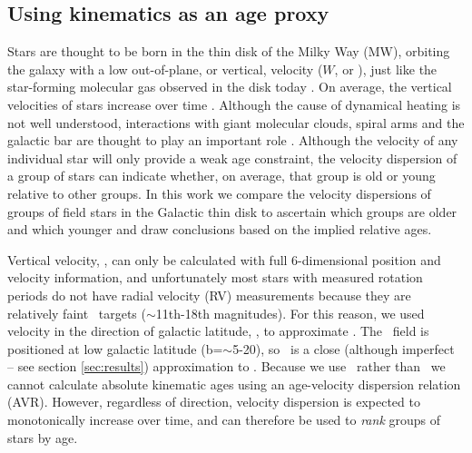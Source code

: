 \subsection{Using kinematics as an age proxy}

Stars are thought to be born in the thin disk of the Milky Way (MW), orbiting
the galaxy with a low out-of-plane, or vertical, velocity ($W$, or \vz),
just like the star-forming molecular gas observed in the disk today
\citep[\eg][]{stark1989, stark2005, aumer2009, martig2014, aumer2016}.
On average, the vertical velocities of stars increase over time
\citep[\eg][]{nordstrom2004, holmberg2007, holmberg2009, aumer2009,
casagrande2011}.
Although the cause of dynamical heating is not well understood, interactions
with giant molecular clouds, spiral arms and the galactic bar are thought to
play an important role \citep[see][for a review of secular evolution in the
MW]{sellwood2014}.
Although the velocity of any individual star will only provide a weak age
constraint, the velocity dispersion of a group of stars can indicate whether,
on average, that group is old or young relative to other groups.
In this work we compare the velocity dispersions of groups of field stars in
the Galactic thin disk to ascertain which groups are older and which younger
and draw conclusions based on the implied relative ages.

Vertical velocity, \vz, can only be calculated with full 6-dimensional
position and velocity information, and unfortunately most stars with measured
rotation periods do not have radial velocity (RV) measurements because they
are relatively faint \kepler\ targets ($\sim$11th-18th magnitudes).
For this reason, we used velocity in the direction of galactic latitude, \vb,
to approximate \vz.
The \kepler\ field is positioned at low galactic latitude
(b=$\sim$5-20\degrees), so \vb\ is a close (although imperfect -- see section
\ref{sec:results}) approximation to \vz.
Because we use \vb\ rather than \vz\, we cannot calculate absolute kinematic
ages using an age-velocity dispersion relation (AVR).
However, regardless of direction, velocity dispersion is expected to
monotonically increase over time, and can therefore be used to {\it rank}
groups of stars by age.

